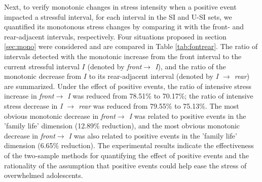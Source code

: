 Next,
to verify monotonic changes in stress intensity when a positive event impacted a stressful interval,
for each interval in the SI and U-SI sets,
we quantified its monotonous stress changes by comparing it with the front- and rear-adjacent intervals, respectively.
Four situations proposed in section \ref{sec:mono} were considered and are compared in Table \ref{tab:fontrear}.
The ratio of intervals detected with the monotonic increase from the front interval to the current stressful interval $I$
(denoted by \emph{front$ \rightarrow$ I}),
and the ratio of the monotonic decrease from $I$ to its rear-adjacent interval (denoted by \emph{I $\rightarrow$ rear}) are summarized.
Under the effect of positive events,
the ratio of intensive stress increase in \emph{front$ \rightarrow$ I} was reduced from 78.51\% to 70.17\%;
the ratio of intensive stress decrease in \emph{I $\rightarrow$ rear} was reduced from 79.55\% to 75.13\%.
The most obvious monotonic decrease in \emph{front$ \rightarrow$ I} was related to positive events
in the 'family life' dimension (12.89\% reduction),
and the most obvious monotonic decrease in \emph{front$ \rightarrow$ I} was also related to positive events in the 'family life' dimension (6.65\% reduction).
The experimental results indicate the effectiveness of the two-sample methods for quantifying the effect of positive events
and the rationality of the assumption that positive events could help ease the stress of overwhelmed adolescents.


